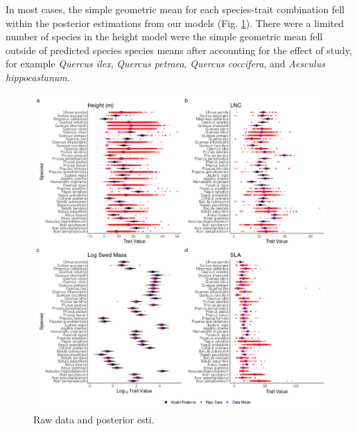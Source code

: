 \documentclass{article}\usepackage[]{graphicx}\usepackage[]{color}
\begin{document}
In most cases, the simple geometric mean for each species-trait combination fell within the posterior estimations from our models (Fig. \ref{figure:TraitDistributions}). There were a limited number of species in the height model were the simple geometric mean fell outside of predicted species species means after accounting for the effect of study, for example \textit{Quercus ilex}, \textit{Quercus petraea}, \textit{Quercus coccifera}, and \textit{Aesculus hippocastanum}.



\begin{figure}[h!]
    \centering
 \includegraphics[width=\textwidth]{..//..//analyses/traits/figures/FourTraitFit_37spp.png} 
    \caption{Raw data and posterior esti.}
    \label{figure:TraitDistributions}
\end{figure}
\end{document}
